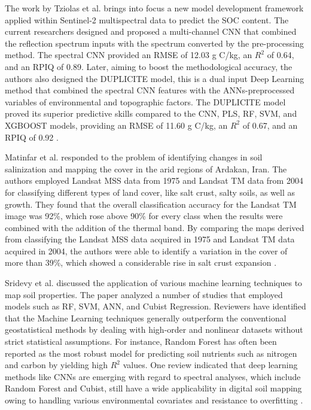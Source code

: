 \documentclass[conference]{IEEEtran}
\begin{document}
The work by Tziolas et al. brings into focus a new model development framework applied within Sentinel-2 multispectral data to predict the SOC content. The current researchers designed and proposed a multi-channel CNN that combined the reflection spectrum inputs with the spectrum converted by the pre-processing method. The spectral CNN provided an RMSE of 12.03 g C/kg, an $R^2$ of 0.64, and an RPIQ of 0.89. Later, aiming to boost the methodological accuracy, the authors also designed the DUPLICITE model, this is a dual input Deep Learning method that combined the spectral CNN features with the ANNs-preprocessed variables of environmental and topographic factors. The DUPLICITE model proved its superior predictive skills compared to the CNN, PLS, RF, SVM, and XGBOOST models, providing an RMSE of 11.60 g C/kg, an $R^2$ of 0.67, and an RPIQ of 0.92 \cite{b24}.
\vspace{5pt}


Matinfar et al. responded to the problem of identifying changes in soil salinization and mapping the cover in the arid regions of Ardakan, Iran. The authors employed Landsat MSS data from 1975 and Landsat TM data from 2004 for classifying different types of land cover, like salt crust, salty soils, as well as growth. They found that the overall classification accuracy for the Landsat TM image was 92\%, which rose above 90\% for every class when the results were combined with the addition of the thermal band. By comparing the maps derived from classifying the Landsat MSS data acquired in 1975 and Landsat TM data acquired in 2004, the authors were able to identify a variation in the cover of more than 39\%, which showed a considerable rise in salt crust expansion \cite{b25}.
\vspace{5pt}


Sridevy et al. discussed the application of various machine learning techniques to map soil properties. The paper analyzed a number of studies that employed models such as RF, SVM, ANN, and Cubist Regression. Reviewers have identified that the Machine Learning techniques generally outperform the conventional geostatistical methods by dealing with high-order and nonlinear datasets without strict statistical assumptions. For instance, Random Forest has often been reported as the most robust model for predicting soil nutrients such as nitrogen and carbon by yielding high $R^2$ values. One review indicated that deep learning methods like CNNs are emerging with regard to spectral analyses, which include Random Forest and Cubist, still have a wide applicability in digital soil mapping owing to handling various environmental covariates and resistance to overfitting \cite{b26}.
\vspace{0.3cm}
\end{document}
